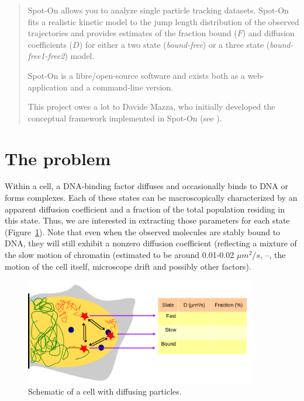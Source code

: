 \begin{abstract}
Spot-On allows you to analyze single particle tracking datasets. Spot-On fits a realistic kinetic model to the jump length distribution of the observed trajectories and provides estimates of the fraction bound ($F$) and diffusion coefficients ($D$) for either a two state (\textit{bound-free}) or a three state (\textit{bound-free1-free2}) model.

Spot-On is a libre/open-source software and exists both as a web-application and a command-line version.

This project owes a lot to Davide Mazza, who initially developed the conceptual framework implemented in Spot-On (see \cite{mazza_benchmark_2012}).
\end{abstract}

\newpage

\tableofcontents
\newpage

\section{The problem}

Within a cell, a DNA-binding factor diffuses and occasionally binds to DNA or forms complexes. Each of these states can be macroscopically characterized by an apparent diffusion coefficient and a fraction of the total population residing in this state. Thus, we are interested in extracting those parameters for each state (Figure~\ref{fig:fig1}). Note that even when the observed molecules are stably bound to DNA, they will still exhibit a nonzero diffusion coefficient (reflecting a mixture of the slow motion of chromatin (estimated to be around 0.01-0.02 $\mu m^2/s$, \cite{shinkai_dynamic_2016} --, the motion of the cell itself, microscope drift and possibly other factors).

\begin{figure}[h]
\centering
\includegraphics[width=0.9\textwidth]{../SPTGUI/static/SPTGUI/img/cell.png}
\caption{\label{fig:fig1}Schematic of a cell with diffusing particles.}
\end{figure}

